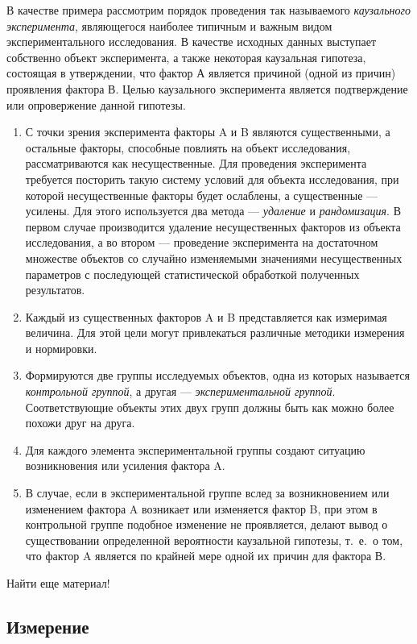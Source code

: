В качестве примера рассмотрим порядок проведения так называемого
\emph{каузального эксперимента}, являющегося наиболее типичным
и важным видом экспериментального исследования.
В качестве исходных данных выступает собственно объект эксперимента,
а также некоторая каузальная гипотеза, состоящая в утверждении,
что фактор А является причиной (одной из причин) проявления фактора В.
Целью каузального эксперимента является подтверждение или опровержение данной гипотезы.
\begin{enumerate}
\item С точки зрения эксперимента факторы A и B являются существенными,
  а остальные факторы, способные повлиять на объект исследования,
  рассматриваются как несущественные.
  Для проведения эксперимента требуется посторить такую систему условий
  для объекта исследования, при которой несущественные факторы будет ослаблены,
  а существенные --- усилены.
  Для этого используется два метода --- \emph{удаление} и \emph{рандомизация}.
  В первом случае производится удаление несущественных факторов из
  объекта исследования, а во втором --- проведение эксперимента на достаточном
  множестве объектов со случайно изменяемыми значениями несущественных параметров
  с последующей статистической обработкой полученных результатов.
\item Каждый из существенных факторов A и B представляется как измеримая величина.
  Для этой цели могут привлекаться различные методики измерения и нормировки.
\item Формируются две группы исследуемых объектов, одна из которых называется
  \emph{контрольной группой}, а другая --- \emph{экспериментальной группой}.
  Соответствующие объекты этих двух групп должны быть как можно более
  похожи друг на друга.
\item Для каждого элемента экспериментальной группы создают ситуацию
  возникновения или усиления фактора A.
\item В случае, если в экспериментальной группе вслед за возникновением
  или изменением фактора A возникает или изменяется фактор B,
  при этом в контрольной группе подобное изменение не проявляется,
  делают вывод о существовании определенной вероятности каузальной гипотезы,
  т.~е.~о том, что фактор A является по крайней мере одной их причин для фактора В.
\end{enumerate}

{\color{red} Найти еще материал!}

\pagebreak

\subsection{Измерение}

